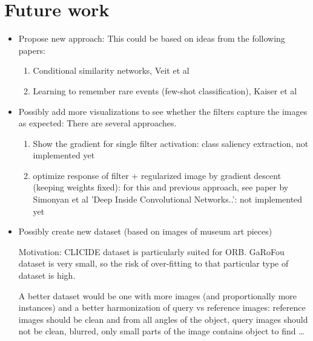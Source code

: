 \documentclass[fleqn]{article}
\begin{document}
\section{Future work}
\begin{itemize}
    \item Propose new approach: This could be based on ideas from the
    following papers:
    \begin{enumerate}
        \item Conditional similarity networks,
        Veit et al~\cite{veit_conditional_2016}
        \item Learning to remember rare events (few-shot classification),
        Kaiser et al~\cite{kaiser_learning_2017}
    \end{enumerate}
    \item Possibly add more visualizations to see whether the filters
    capture the images as expected: There are several approaches.
    \begin{enumerate}
        \item Show the gradient for single filter activation:
        class saliency extraction, not implemented yet
        \item optimize response of filter +
        regularized image by gradient descent (keeping weights fixed):
        for this and previous approach, see paper by
        Simonyan et al 'Deep Inside Convolutional Networks..':
        not implemented yet
    \end{enumerate}

    \item Possibly create new dataset
    (based on images of museum art pieces)

    Motivation: CLICIDE dataset is particularly suited for ORB.
    GaRoFou dataset is very small, so the risk of over-fitting
    to that particular type of dataset is high.

    A better dataset would be one with more images
    (and proportionally more instances) and a better harmonization of
    query vs reference images: reference images should be clean and from
    all angles of the object, query images should not be clean, blurred,
    only small parts of the image contains object to find \dots
\end{itemize}
\end{document}
